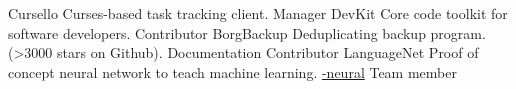 



\begin{cvhonors2}

  \cvhonor
    {Cursello} %
    {Curses-based task tracking client.} %
    {\href{https://github.com/TBurchfield/cursello}{\faGithubSquare\acvHeaderIconSep\@cursello}} %
    {Manager} %
  \cvhonor
    {DevKit} %
    {Core code toolkit for software developers.} %
    {\href{https://github.com/dsmith47/devkit}{\faGithubSquare\acvHeaderIconSep\@cursello}} %
    {Contributor} %
  \cvhonor
    {BorgBackup} %
    {Deduplicating backup program.  (>3000 stars on Github).} %
    {\href{https://github.com/borgbackup/borg}{\faGithubSquare\acvHeaderIconSep\@cursello}} %
    {Documentation Contributor} %
  \cvhonor
    {LanguageNet} %
    {Proof of concept neural network to teach machine learning.} %
    {\href{https://github.com/noyoshi/language-nn-matlab}{\faGithubSquare\acvHeaderIconSep\@language-neural}} %
    {Team member} %

\end{cvhonors2}
